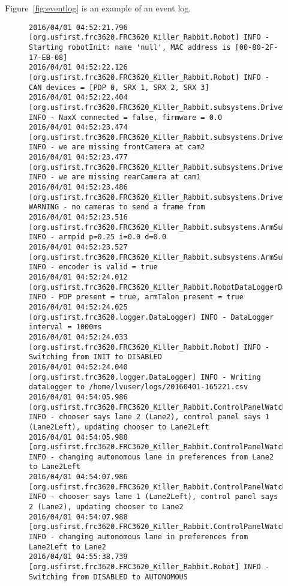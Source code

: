 \documentclass[]{article}
\begin{document}
\begin{itemize}[topsep=0pt]
Figure~\ref{fig:eventlog} is an example of an event log.
\begin{figure}[h]
\begin{mdframed}
\begin{lstlisting}[basicstyle=\ttfamily\tiny]
2016/04/01 04:52:21.796 [org.usfirst.frc3620.FRC3620_Killer_Rabbit.Robot] INFO - Starting robotInit: name 'null', MAC address is [00-80-2F-17-EB-08]
2016/04/01 04:52:22.126 [org.usfirst.frc3620.FRC3620_Killer_Rabbit.Robot] INFO - CAN devices = [PDP 0, SRX 1, SRX 2, SRX 3]
2016/04/01 04:52:22.404 [org.usfirst.frc3620.FRC3620_Killer_Rabbit.subsystems.DriveSubsystem] INFO - NaxX connected = false, firmware = 0.0
2016/04/01 04:52:23.474 [org.usfirst.frc3620.FRC3620_Killer_Rabbit.subsystems.DriveSubsystem] INFO - we are missing frontCamera at cam2
2016/04/01 04:52:23.477 [org.usfirst.frc3620.FRC3620_Killer_Rabbit.subsystems.DriveSubsystem] INFO - we are missing rearCamera at cam1
2016/04/01 04:52:23.486 [org.usfirst.frc3620.FRC3620_Killer_Rabbit.subsystems.DriveSubsystem] WARNING - no cameras to send a frame from
2016/04/01 04:52:23.516 [org.usfirst.frc3620.FRC3620_Killer_Rabbit.subsystems.ArmSubsystem] INFO - armpid p=0.25 i=0.0 d=0.0
2016/04/01 04:52:23.527 [org.usfirst.frc3620.FRC3620_Killer_Rabbit.subsystems.ArmSubsystem] INFO - encoder is valid = true 
2016/04/01 04:52:24.012 [org.usfirst.frc3620.FRC3620_Killer_Rabbit.RobotDataLoggerDataProvider] INFO - PDP present = true, armTalon present = true
2016/04/01 04:52:24.025 [org.usfirst.frc3620.logger.DataLogger] INFO - DataLogger interval = 1000ms
2016/04/01 04:52:24.033 [org.usfirst.frc3620.FRC3620_Killer_Rabbit.Robot] INFO - Switching from INIT to DISABLED
2016/04/01 04:52:24.040 [org.usfirst.frc3620.logger.DataLogger] INFO - Writing dataLogger to /home/lvuser/logs/20160401-165221.csv
2016/04/01 04:54:05.986 [org.usfirst.frc3620.FRC3620_Killer_Rabbit.ControlPanelWatcher] INFO - chooser says lane 2 (Lane2), control panel says 1 (Lane2Left), updating chooser to Lane2Left
2016/04/01 04:54:05.988 [org.usfirst.frc3620.FRC3620_Killer_Rabbit.ControlPanelWatcher] INFO - changing autonomous lane in preferences from Lane2 to Lane2Left
2016/04/01 04:54:07.986 [org.usfirst.frc3620.FRC3620_Killer_Rabbit.ControlPanelWatcher] INFO - chooser says lane 1 (Lane2Left), control panel says 2 (Lane2), updating chooser to Lane2
2016/04/01 04:54:07.988 [org.usfirst.frc3620.FRC3620_Killer_Rabbit.ControlPanelWatcher] INFO - changing autonomous lane in preferences from Lane2Left to Lane2
2016/04/01 04:55:38.739 [org.usfirst.frc3620.FRC3620_Killer_Rabbit.Robot] INFO - Switching from DISABLED to AUTONOMOUS

\end{lstlisting}
\end{mdframed}
\end{figure}
\end{itemize}
\end{document}
